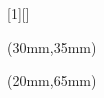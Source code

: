 \usepackage[absolute,overlay]{textpos}
\usepackage{graphicx}

[1][]
{
\begin{textblock*}{90mm}(30mm,35mm)\Large
  \inserttitle \\
      \vspace{2mm}
    \normalsize {\insertdate}
\end{textblock*}
\begin{textblock*}{90mm}(20mm,65mm)
  \small
  \insertauthor\\
  \vspace{2mm}
  \insertinstitute\\
\end{textblock*}
}
